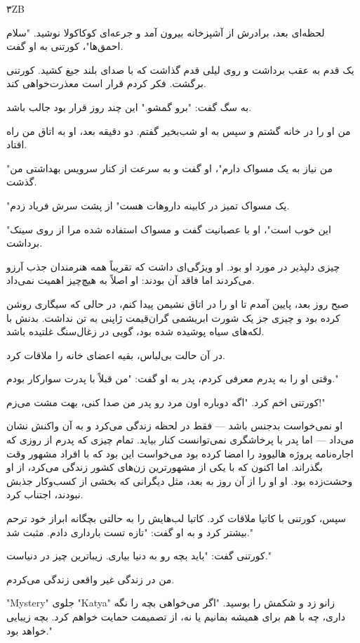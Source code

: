 ۳ZB

لحظه‌ای بعد، برادرش از آشپزخانه بیرون آمد و جرعه‌ای کوکاکولا نوشید. "سلام احمق‌ها"، کورتنی به او گفت. 

یک قدم به عقب برداشت و روی لیلی قدم گذاشت که با صدای بلند جیغ کشید. کورتنی برگشت. فکر کردم قرار است معذرت‌خواهی کند. 

به سگ گفت: "برو گمشو." این چند روز قرار بود جالب باشد.

من او را در خانه گشتم و سپس به او شب‌بخیر گفتم. دو دقیقه بعد، او به اتاق من راه افتاد.

"من نیاز به یک مسواک دارم"، او گفت و به سرعت از کنار سرویس بهداشتی من گذشت. 

"یک مسواک تمیز در کابینه داروهات هست" از پشت سرش فریاد زدم.

"این خوب است"، او با عصبانیت گفت و مسواک استفاده شده مرا از روی سینک برداشت.

چیزی دلپذیر در مورد او بود. او ویژگی‌ای داشت که تقریباً همه هنرمندان جذب آرزو می‌کردند اما فاقد آن بودند: او اصلاً به هیچ‌چیز اهمیت نمی‌داد.

صبح روز بعد، پایین آمدم تا او را در اتاق نشیمن پیدا کنم، در حالی که سیگاری روشن کرده بود و چیزی جز یک شورت ابریشمی گران‌قیمت ژاپنی به تن نداشت. بدنش با لکه‌های سیاه پوشیده شده بود، گویی در زغال‌سنگ غلتیده باشد.

در آن حالت بی‌لباس، بقیه اعضای خانه را ملاقات کرد. 

وقتی او را به پدرم معرفی کردم، پدر به او گفت: "من قبلاً با پدرت سوارکار بودم."

کورتنی اخم کرد. "اگه دوباره اون مرد رو پدر من صدا کنی، بهت مشت می‌زم!"

او نمی‌خواست بدجنس باشد — فقط در لحظه زندگی می‌کرد و به آن واکنش نشان می‌داد — اما پدر با پرخاشگری نمی‌توانست کنار بیاید. تمام چیزی که پدرم از روزی که اجاره‌نامه پروژه هالیوود را امضا کرده بود می‌خواست این بود که با افراد مشهور وقت بگذراند. اما اکنون که با یکی از مشهورترین زن‌های کشور زندگی می‌کرد، از او وحشت‌زده بود. او او را از آن روز به بعد، مثل دیگرانی که بخشی از کسب‌وکار جذبش نبودند، اجتناب کرد.

سپس، کورتنی با کاتیا ملاقات کرد. کاتیا لب‌هایش را به حالتی بچگانه ابراز خود ترحم بیشتر کرد و به او گفت: "تازه تست بارداری دادم. مثبت شد."

کورتنی گفت: "باید بچه رو به دنیا بیاری. زیباترین چیز در دنیاست."

من در زندگی غیر واقعی زندگی می‌کردم.

"Mystery" جلوی "Katya" زانو زد و شکمش را بوسید. "اگر می‌خواهی بچه را نگه داری، چه با هم برای همیشه بمانیم یا نه، از تصمیمت حمایت خواهم کرد. بچه زیبایی خواهد بود."

